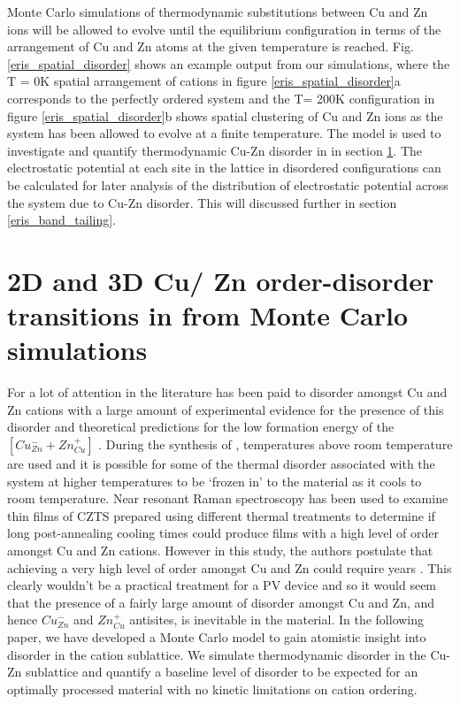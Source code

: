 \documentclass[11pt, twoside]{report}
\begin{document}
Monte Carlo simulations of thermodynamic substitutions between Cu and Zn ions will be allowed to evolve until the equilibrium configuration in terms of the arrangement of Cu and Zn atoms at the given temperature is reached. Fig. \ref{eris_spatial_disorder} shows an example output from our simulations, where the T = 0K spatial arrangement of cations in figure \ref{eris_spatial_disorder}a corresponds to the perfectly ordered system and the T= 200K configuration in figure \ref{eris_spatial_disorder}b shows spatial clustering of Cu and Zn ions as the system has been allowed to evolve at a finite temperature. The model is used to investigate and quantify thermodynamic Cu-Zn disorder in {\CZTS} in section \ref{CZTS_MC}. The electrostatic potential at each site in the lattice in disordered configurations can be calculated for later analysis of the distribution of electrostatic potential across the system due to Cu-Zn disorder. This will discussed further in section \ref{eris_band_tailing}. 




\section{2D and 3D Cu/ Zn order-disorder transitions in {\CZTS} from Monte Carlo simulations}\label{CZTS_MC}
For {\CZTS} a lot of attention in the literature has been paid to disorder amongst Cu and Zn cations with a large amount of experimental evidence for the presence of this disorder \cite{Schorr, CZTS_Xray, CZTS_TEM} and theoretical predictions for the low formation energy of the  $[Cu_{Zn}^{-} + Zn_{Cu}^{+}]$ \cite{defects_Chen}.
During the synthesis of {\CZTS}, temperatures above room temperature are used and it is possible for some of the thermal disorder associated with the system at higher temperatures to be `frozen in' to the material as it cools to room temperature.
Near resonant Raman spectroscopy has been used to examine thin films of CZTS prepared using different thermal treatments to determine if long post-annealing cooling times could produce films with a high level of order amongst Cu and Zn cations. However in this study, the authors postulate that achieving a very high level of order amongst Cu and Zn could require years \cite{Katharina}. This clearly wouldn't be a practical treatment for a PV device and so it would seem that the presence of a fairly large amount of disorder amongst Cu and Zn, and hence $Cu_{Zn}^{-}$ and $Zn_{Cu}^{+}$ antisites,  is inevitable in the material. In the following paper, we have developed a Monte Carlo model to gain atomistic insight into disorder in the cation sublattice. We simulate thermodynamic disorder in the Cu-Zn sublattice and quantify a baseline level of disorder to be expected for an optimally processed material with no kinetic limitations on cation ordering.
\end{document}
